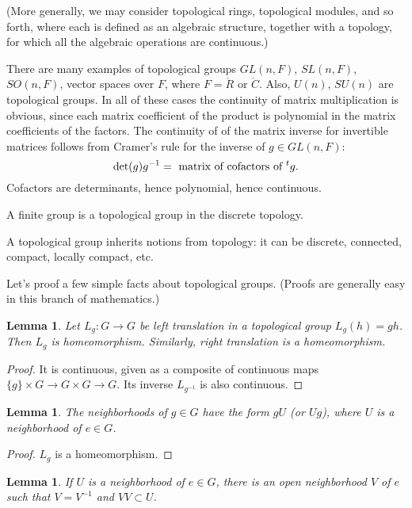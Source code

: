\documentclass{amsart}
\newtheorem{lemma}[equation]{Lemma}
\def\t#1{\hbox{}^t#1}
\def\CC{\ring{C}}
\def\RR{\ring{R}}
\begin{document}
(More generally, we may consider topological rings, topological
modules, and so forth, where each is defined as an algebraic
structure, together with a topology, for which all the algebraic
operations are continuous.)

There are many examples of topological groups $GL(n,F)$, $SL(n,F)$,
$SO(n,F)$, vector spaces over $F$, where $F=\RR$ or $\CC$.
Also, $U(n)$, $SU(n)$ are topological groups.  In all of these cases the
continuity of matrix multiplication is obvious, since each matrix
coefficient of the product is polynomial in the matrix coefficients of
the factors.  The continuity of of the matrix inverse for invertible
matrices follows from Cramer's rule \cite[Prop.~5.4]{knapp-basic} for
the inverse of $g\in GL(n,F)$:
\[
\det(g) g^{-1} = \text{  matrix of cofactors of } \t{g}.
\]
Cofactors are determinants, hence polynomial, hence continuous.

A finite group is a topological group in the discrete topology.

A topological group inherits notions from topology: it can be
discrete, connected, compact, locally compact, etc.

Let's proof a few simple facts about topological groups.  (Proofs are
generally easy in this branch of mathematics.)

\begin{lemma}
Let $L_g:G\to G$ be left translation in a topological group $L_g(h) = g h$.
Then $L_g$ is homeomorphism.  Similarly, right translation is a homeomorphism.
\end{lemma}

\begin{proof}
It is continuous, given as 
a composite of continuous maps $\{g\}\times G \to G\times G \to G$.
Its inverse $L_{g^{-1}}$ is also continuous.
\end{proof}

\begin{lemma}  The neighborhoods of $g\in G$ have the form $g U$ (or $Ug$),
where $U$ is a neighborhood of $e\in G$.
\end{lemma}

\begin{proof} $L_g$ is a homeomorphism.
\end{proof}

\begin{lemma} If $U$ is a neighborhood of $e\in G$, there is an open neighborhood  $V$ of $e$
such that $V= V^{-1}$ and $VV \subset U$.
\end{lemma}
\end{document}
